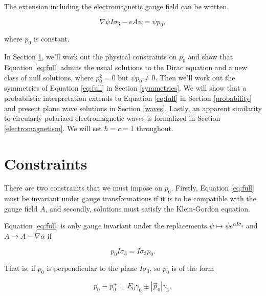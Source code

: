 \documentclass{article}
\begin{document}
  The extension including the electromagnetic gauge field can be written

  \begin{equation}
    \nabla \psi I \sigma_3 - e A \psi = \psi p_0, \label{eq:full}
  \end{equation}

  where $p_0$ is constant.

  In Section \ref{constraints}, we'll work out the physical constraints on $p_0$ and show that Equation \ref{eq:full} admits the usual solutions to the Dirac equation and a new class of null solutions, where $p_0^2 = 0$ but $\psi p_0 \not = 0$. Then we'll work out the symmetries of Equation \ref{eq:full} in Section \ref{symmetries}. We will show that a probablistic interpretation extends to Equation \ref{eq:full} in Section \ref{probability} and present plane wave solutions in Section \ref{waves}. Lastly, an apparent similarity to circularly polarized electromagnetic waves is formalized in Section \ref{electromagnetism}. We will set $\hbar = c = 1$ throughout.


  \section{Constraints}\label{constraints}

  There are two constraints that we must impose on $p_0$. Firstly, Equation \ref{eq:full} must be invariant under gauge transformations if it is to be compatible with the gauge field $A$, and secondly, solutions must satisfy the Klein-Gordon equation.

  Equation \ref{eq:full} is only gauge invariant under the replacements $\psi \mapsto \psi e^{\alpha I \sigma_3}$ and $A \mapsto A - \nabla \alpha$ if 

  \begin{equation}
    p_0 I\sigma_3 = I \sigma_3 p_0. \label{momentum-perp-spin}
  \end{equation} 

  That is, if $p_0$ is perpendicular to the plane $I \sigma_3$, so $p_0$ is of the form

  \begin{equation}
    p_0 \equiv p_0^\pm = E_0 \gamma_0 \pm |\vec p_0| \gamma_3,\label{eq:p_0}
  \end{equation} 
\end{document}

